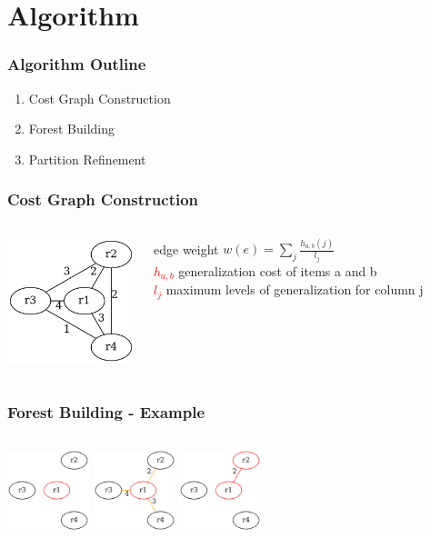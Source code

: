 \section{Algorithm}

\begin{frame}
  \frametitle{Algorithm Outline}
  \begin{enumerate}
    \item Cost Graph Construction
    \item Forest Building
    \item Partition Refinement
  \end{enumerate}
\end{frame}

\begin{frame}
  \frametitle{Cost Graph Construction}
  \begin{columns}
    \includegraphics[width=140px]{../graphs/cost-graph.png}
    \begin{block}{edge weight}
      \(w(e)=\sum_{j}^{} \frac{h_{a,b}(j)}{l_{j}}\) \\
      \scriptsize{
	\textcolor{red}{ \(h_{a,b}\) } generalization cost of items a and b \\
	\textcolor{red}{ \(l_{j}\) } maximum levels of generalization for column j
      }
    \end{block}
  \end{columns}
\end{frame}

\begin{frame}
  \frametitle{Forest Building - Example}
  \begin{columns}
    \includegraphics[width=90px]{../graphs/cost-graph-s0.png}
    \includegraphics[width=90px]{../graphs/cost-graph-s1.png}
    \includegraphics[width=90px]{../graphs/cost-graph-s2.png}
  \end{columns}
\end{frame}

